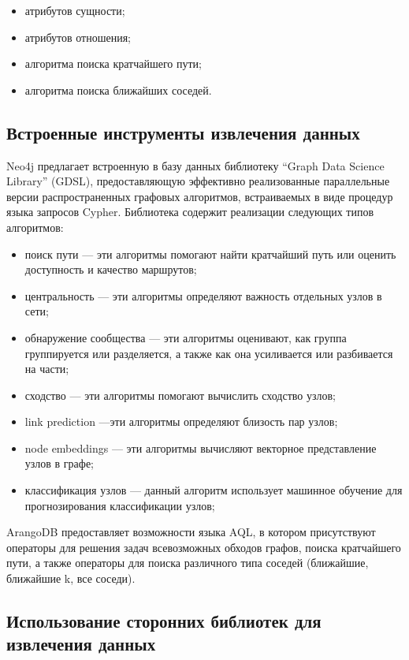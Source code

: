 \begin{itemize}
    \item атрибутов сущности;
    \item атрибутов отношения;
    \item алгоритма поиска кратчайшего пути;
    \item алгоритма поиска ближайших соседей.
\end{itemize}

\subsection{Встроенные инструменты извлечения данных}

Neo4j предлагает встроенную в базу данных библиотеку “Graph Data Science Library” (GDSL), предоставляющую эффективно реализованные
параллельные версии распространенных графовых алгоритмов, встраиваемых в виде процедур языка запросов Cypher. Библиотека содержит
реализации следующих типов алгоритмов:

\begin{itemize}
    \item поиск пути — эти алгоритмы помогают найти кратчайший путь или оценить доступность и качество маршрутов;
    \item центральность — эти алгоритмы определяют важность отдельных узлов в сети;
    \item обнаружение сообщества — эти алгоритмы оценивают, как группа группируется или разделяется, а также как она усиливается или разбивается на части;
    \item сходство — эти алгоритмы помогают вычислить сходство узлов;
    \item link prediction —эти алгоритмы определяют близость пар узлов;
    \item node embeddings — эти алгоритмы вычисляют векторное представление узлов в графе;
    \item классификация узлов — данный алгоритм использует машинное обучение для прогнозирования классификации узлов;
\end{itemize}

ArangoDB предоставляет возможности языка AQL, в котором присутствуют операторы для решения задач всевозможных обходов графов, поиска
кратчайшего пути, а также операторы для поиска различного типа соседей (ближайшие, ближайшие k, все соседи).

\subsection{Использование сторонних библиотек для извлечения данных}

